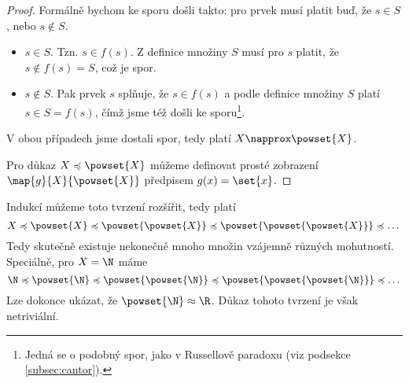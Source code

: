 \begin{proof}
    Formálně bychom ke sporu došli takto: pro prvek musí platit buď, že $s\in S$, nebo $s\notin S$.
    \begin{itemize}
        \item $s\in S$. Tzn. $s\in f(s)$. Z definice množiny $S$ musí pro $s$ platit, že $s\notin f(s)=S$, což je spor.
        \item $s\notin S$. Pak prvek $s$ splňuje, že $s\in f(s)$ a podle definice množiny $S$ platí $s\in S=f(s)$, čímž jsme též došli ke sporu\footnote{Jedná se o podobný spor, jako v Russellově paradoxu (viz podsekce \ref{subsec:cantor}).}.
    \end{itemize}
    V obou případech jsme dostali spor, tedy platí $X\napprox\powset{X}$.\par
    Pro důkaz $X\preccurlyeq\powset{X}$ můžeme definovat prosté zobrazení $\map{g}{X}{\powset{X}}$ předpisem $g(x)=\set{x}$.
\end{proof}
Indukcí můžeme toto tvrzení rozšířit, tedy platí
\begin{equation*}
    X\preccurlyeq\powset{X}\preccurlyeq\powset{\powset{X}}\preccurlyeq\powset{\powset{\powset{X}}}\preccurlyeq\dots
\end{equation*}
Tedy skutečně existuje nekonečně mnoho množin vzájemně různých mohutností. Speciálně, pro $X=\N$ máme
\begin{equation*}
    \N\preccurlyeq\powset{\N}\preccurlyeq\powset{\powset{\N}}\preccurlyeq\powset{\powset{\powset{\N}}}\preccurlyeq\dots
\end{equation*}
Lze dokonce ukázat, že $\powset{\N}\approx\R$. Důkaz tohoto tvrzení je však netriviální.